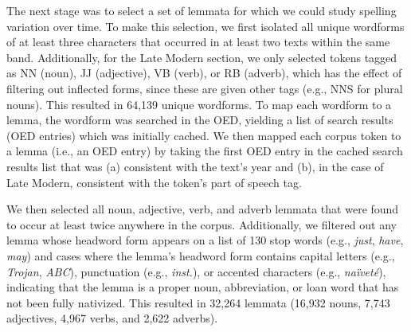 \documentclass[doc,biblatex]{apa7}
\begin{document}
The next stage was to select a set of lemmata for which we could study spelling variation over time. To make this selection, we first isolated all unique wordforms of at least three characters that occurred in at least two texts within the same band. Additionally, for the Late Modern section, we only selected tokens tagged as NN (noun), JJ (adjective), VB (verb), or RB (adverb), which has the effect of filtering out inflected forms, since these are given other tags (e.g., NNS for plural nouns). This resulted in 64,139 unique wordforms. To map each wordform to a lemma, the wordform was searched in the OED, yielding a list of search results (OED entries) which was initially cached. We then mapped each corpus token to a lemma (i.e., an OED entry) by taking the first OED entry in the cached search results list that was (a) consistent with the text's year and (b), in the case of Late Modern, consistent with the token's part of speech tag.

We then selected all noun, adjective, verb, and adverb lemmata that were found to occur at least twice anywhere in the corpus. Additionally, we filtered out any lemma whose headword form appears on a list of 130 stop words (e.g., \textit{just}, \textit{have}, \textit{may}) and cases where the lemma's headword form contains capital letters (e.g., \textit{Trojan}, \textit{ABC}), punctuation (e.g., \textit{inst.}), or accented characters (e.g., \textit{naïveté}), indicating that the lemma is a proper noun, abbreviation, or loan word that has not been fully nativized. This resulted in 32,264 lemmata (16,932 nouns, 7,743 adjectives, 4,967 verbs, and 2,622 adverbs).
\end{document}
